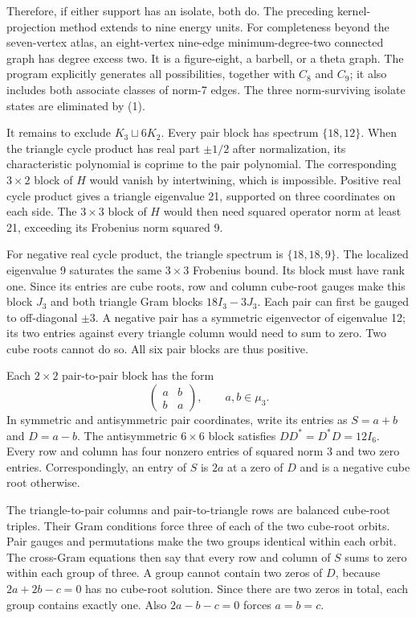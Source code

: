 \documentclass[11pt,a4paper]{article}
\newcommand{\muT}{\mu_3}\newcommand{\B}{B}\newcommand{\HH}{H^{*}}\newcommand{\QQ}{\mathbb Q}\newcommand{\ZZ}{\mathbb Z}\newcommand{\tr}{\operatorname{tr}}\newcommand{\diag}{\operatorname{diag}}\newcommand{\spec}{\operatorname{spec}}
\begin{document}
Therefore, if either support has an isolate, both do. The preceding kernel-projection method extends to nine energy units. For completeness beyond the seven-vertex atlas, an eight-vertex nine-edge minimum-degree-two connected graph has degree excess two. It is a figure-eight, a barbell, or a theta graph. The program explicitly generates all possibilities, together with $C_8$ and $C_9$; it also includes both associate classes of norm-7 edges. The three norm-surviving isolate states are eliminated by (1).

It remains to exclude $K_3\sqcup6K_2$. Every pair block has spectrum $\{18,12\}$. When the triangle cycle product has real part $\pm1/2$ after normalization, its characteristic polynomial is coprime to the pair polynomial. The corresponding $3\times2$ block of $H$ would vanish by intertwining, which is impossible. Positive real cycle product gives a triangle eigenvalue 21, supported on three coordinates on each side. The $3\times3$ block of $H$ would then need squared operator norm at least 21, exceeding its Frobenius norm squared 9.

For negative real cycle product, the triangle spectrum is $\{18,18,9\}$. The localized eigenvalue 9 saturates the same $3\times3$ Frobenius bound. Its block must have rank one. Since its entries are cube roots, row and column cube-root gauges make this block $J_3$ and both triangle Gram blocks $18I_3-3J_3$. Each pair can first be gauged to off-diagonal $\pm3$. A negative pair has a symmetric eigenvector of eigenvalue 12; its two entries against every triangle column would need to sum to zero. Two cube roots cannot do so. All six pair blocks are thus positive.

Each $2\times2$ pair-to-pair block has the form
\[
 \begin{pmatrix}a&b\\b&a\end{pmatrix},\qquad a,b\in\muT.
\]
In symmetric and antisymmetric pair coordinates, write its entries as $S=a+b$ and $D=a-b$. The antisymmetric $6\times6$ block satisfies $DD^*=D^*D=12I_6$. Every row and column has four nonzero entries of squared norm 3 and two zero entries. Correspondingly, an entry of $S$ is $2a$ at a zero of $D$ and is a negative cube root otherwise.

The triangle-to-pair columns and pair-to-triangle rows are balanced cube-root triples. Their Gram conditions force three of each of the two cube-root orbits. Pair gauges and permutations make the two groups identical within each orbit. The cross-Gram equations then say that every row and column of $S$ sums to zero within each group of three. A group cannot contain two zeros of $D$, because $2a+2b-c=0$ has no cube-root solution. Since there are two zeros in total, each group contains exactly one. Also $2a-b-c=0$ forces $a=b=c$.
\end{document}
